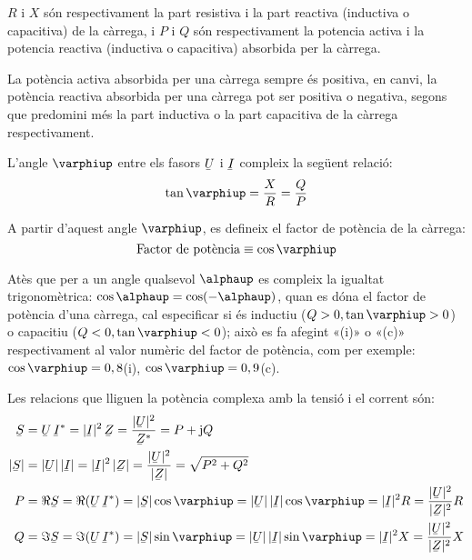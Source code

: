 $R$ i $X$ són respectivament la part resistiva i la part reactiva
(inductiva o capacitiva) de la càrrega, i $P$ i $Q$ són
respectivament la potencia activa i la potencia reactiva (inductiva
o capacitiva) absorbida per la càrrega.

La potència activa absorbida per una càrrega sempre és positiva, en
canvi, la potència reactiva absorbida per una càrrega pot ser
positiva o negativa, segons que predomini més la part inductiva o la
part capacitiva de la càrrega respectivament.

L'angle $\varphiup$ entre els fasors $\cmplx{U}$ i $\cmplx{I}$ compleix la següent relació:
\begin{equation}
   \tan\varphiup = \frac{X}{R} = \frac{Q}{P}
\end{equation}

A partir d'aquest angle $\varphiup$, es
defineix el factor de potència de la càrrega:
\begin{equation}
   \text{Factor de potència} \equiv \cos\varphiup
\end{equation}

Atès que per a un angle qualsevol $\alphaup$ es compleix la igualtat
trigonomètrica: $\cos\alphaup = \cos(-\alphaup)$, quan es dóna el factor
de potència d'una càrrega, cal especificar si és inductiu ($Q>0,
\tan\varphiup>0$) o capacitiu ($Q<0, \tan\varphiup<0$); això es fa
afegint «(i)» o «(c)» respectivament al valor numèric del factor
de potència, com per exemple: $\cos\varphiup=0,8$(i),
$\cos\varphiup=0,9$(c).

Les relacions que lliguen la potència complexa amb la tensió i el corrent són:
\begin{align}
   \cmplx{S} &=  \cmplx{U} \,\cmplx{I}^* =
   |\cmplx{I}|^2 \,\cmplx{Z} = \frac{|\cmplx{U}|^2}{\cmplx{Z}^*} =
   P + \ju Q \label{eq:s_mono1}\\
   |\cmplx{S}| &= |\cmplx{U}| \,|\cmplx{I}| =
   |\cmplx{I}|^2 \,|\cmplx{Z}| = \frac{|\cmplx{U}|^2}{|\cmplx{Z}|} =
   \sqrt{P^2+Q^2} \\
   P &= \Re\cmplx{S} = \Re (\cmplx{U} \, \cmplx{I}^*) = |\cmplx{S}| \cos\varphiup =
   |\cmplx{U}|\, |\cmplx{I}| \cos\varphiup = |\cmplx{I}|^2 R =
   \frac{|\cmplx{U}|^2}{|\cmplx{Z}|^2}R\\
   Q &= \Im\cmplx{S} = \Im (\cmplx{U} \, \cmplx{I}^*) = |\cmplx{S}| \sin\varphiup =
   |\cmplx{U}| \,|\cmplx{I}|\sin\varphiup  = |\cmplx{I}|^2 X =
   \frac{|\cmplx{U}|^2}{|\cmplx{Z}|^2}X
\end{align}

